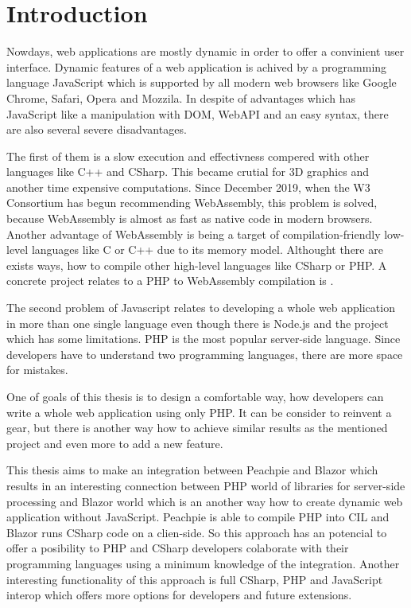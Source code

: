 \chapter*{Introduction}

Nowdays, web applications are mostly dynamic in order to offer a convinient user interface.
Dynamic features of a web application is achived by a programming language JavaScript which is supported by all modern web browsers like Google Chrome, Safari, Opera and Mozzila.
In despite of advantages which has JavaScript like a manipulation with DOM, WebAPI and an easy syntax, there are also several severe disadvantages.

The first of them is a slow execution and effectivness compered with other languages like C++ and CSharp.
This became crutial for 3D graphics and another time expensive computations.
Since December 2019, when the W3 Consortium has begun recommending WebAssembly, this problem is solved, because WebAssembly is almost as fast as native code in modern browsers.
Another advantage of WebAssembly is being a target of compilation-friendly low-level languages like C or C++ due to its memory model.
Althought there are exists ways, how to compile other high-level languages like CSharp or PHP.
A concrete project relates to a PHP to WebAssembly compilation is \cite{Pib}.

The second problem of Javascript relates to developing a whole web application in more than one single language even though there is Node.js and the project \cite{Pib} which has some limitations.
PHP is the most popular server-side language.
Since developers have to understand two programming languages, there are more space for  mistakes.

One of goals of this thesis is to design a comfortable way, how developers can write a whole web application using only PHP.
It can be consider to reinvent a gear, but there is another way how to achieve similar results as the mentioned project and even more to add a new feature.

This thesis aims to make an integration between Peachpie and Blazor which results in an interesting connection between PHP world of libraries for server-side processing and Blazor world which is an another way how to create dynamic web application without JavaScript.
Peachpie is able to compile PHP into CIL and Blazor runs CSharp code on a clien-side.
So this approach has an potencial to offer a posibility to PHP and CSharp developers colaborate with their programming languages using a minimum knowledge of the integration. 
Another interesting functionality of this approach is full CSharp, PHP and JavaScript interop which offers more options for developers and future extensions.

